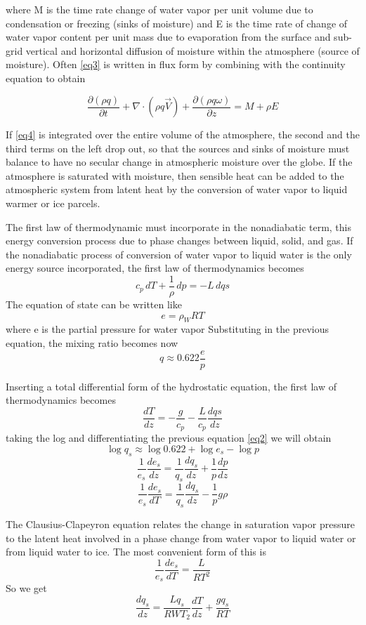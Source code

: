 where M is the time rate change of water vapor per unit volume due to condensation or freezing (sinks of moisture) and E is the time rate of change of water vapor content per unit mass due to evaporation from the surface and sub-grid vertical and horizontal diffusion of moisture within the atmosphere (source of moisture).
Often \ref{eq3} is written in flux form by combining with the continuity equation to obtain

\begin{equation}\label{eq4}
	\frac{\partial (\rho q)}{\partial t} + \nabla \cdot (\rho q \vec{V}) + \frac{\partial (\rho q \omega)}{\partial z} = M + \rho E
\end{equation}

If \ref{eq4} is integrated over the entire volume of the atmosphere, the second and the third terms on the left drop out, so that the sources and sinks of moisture must balance to have no secular change in atmospheric moisture over the globe.
If the atmosphere is saturated with moisture, then sensible heat can be added to the atmospheric system from latent heat by the conversion of water vapor to liquid warmer or ice parcels.

The first law of thermodynamic must incorporate in the nonadiabatic term, this energy conversion process due to phase changes between liquid, solid, and gas.
If the nonadiabatic process of conversion of water vapor to liquid water is the only energy source incorporated, the first law of thermodynamics becomes
$$c_p \, dT + \frac{1}{\rho} \, dp = - L \, dqs$$
The equation of state can be written like $$e = \rho_{W} RT$$ where e is the partial pressure for water vapor
Substituting in the previous equation, the mixing ratio becomes now
\begin{equation}\label{eq2}
	q\approx 0.622 \frac{e}{p}
\end{equation}

Inserting a total differential form of the hydrostatic equation, the first law of thermodynamics becomes $$\frac{dT}{dz} = - \frac{g}{c_p} - \frac{L}{c_p} \frac{dqs}{dz}$$
taking the log and differentiating the previous equation \ref{eq2} we will obtain
$$\log q_s \approx \log 0.622 + \log e_s - \log p$$
$$\frac{1}{e_s} \frac{d e_s}{d z} = \frac{1}{q_s} \frac{d q_s}{d z} + \frac{1}{p} \frac{d p}{d z}$$
$$\frac{1}{e_s} \frac{d e_s}{d T} = \frac{1}{q_s} \frac{d q_s}{d z} - \frac{1}{p} g \rho$$

The Clausius-Clapeyron equation relates the change in saturation vapor pressure to the latent heat involved in a phase change from water vapor to liquid water or from liquid water to ice. The most convenient form of this is $$\frac{1}{e_s} \frac{d e_s}{d T} = \frac{L}{R T^2}$$
So we get $$\frac{d q_s}{d z} = \frac{L q_s}{R W T_2} \frac{d T}{d z} + \frac{g q_s}{R T}$$

